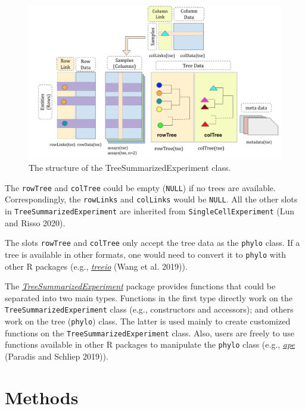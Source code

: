 \documentclass[]{article}
\begin{document}
\begin{figure}
\includegraphics[width=1\linewidth,]{tse} \caption{The structure of the TreeSummarizedExperiment class.}\label{fig:use-knitr}
\end{figure}

The \texttt{rowTree} and \texttt{colTree} could be empty (\texttt{NULL}) if no trees are available.
Correspondingly, the \texttt{rowLinks} and \texttt{colLinks} would be \texttt{NULL}. All the other
slots in \texttt{TreeSummarizedExperiment} are inherited from \texttt{SingleCellExperiment} (Lun and Risso 2020).

The slots \texttt{rowTree} and \texttt{colTree} only accept the tree data as the \texttt{phylo}
class. If a tree is available in other formats, one would need to convert it to \texttt{phylo} with other R packages (e.g., \emph{\href{https://bioconductor.org/packages/3.11/treeio}{treeio}} (Wang et al. 2019)).

The \emph{\href{https://bioconductor.org/packages/3.11/TreeSummarizedExperiment}{TreeSummarizedExperiment}} package provides functions that could be separated into two main types. Functions in the first type directly work on the \texttt{TreeSummarizedExperiment} class (e.g., constructors and accessors); and others work on the tree (\texttt{phylo}) class. The latter is used mainly to create customized functions on the \texttt{TreeSummarizedExperiment} class. Also, users are freely to use functions available in other R packages to manipulate the \texttt{phylo} class (e.g., \emph{\href{https://CRAN.R-project.org/package=ape}{ape}} (Paradis and Schliep 2019)).

\hypertarget{methods}{%
\section{Methods}\label{methods}}
\end{document}
